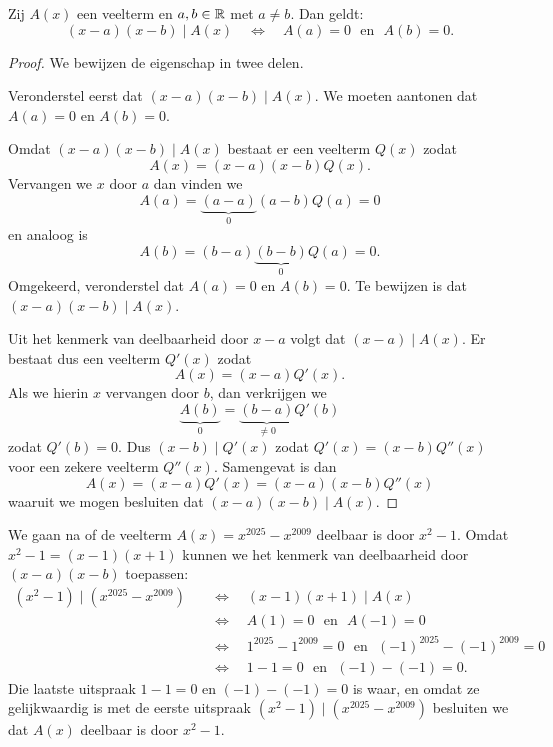 \documentclass{ximera}
\begin{document}
\begin{stelling} 
Zij $A(x)$ een veelterm en $a,b \in \mathbb{R}$ met $a \neq b$. Dan geldt:
\[
(x-a)(x-b) \mid A(x) \quad \Leftrightarrow \quad A(a) = 0 \,\, \text{ en } \,\, A(b) = 0.
\]
\end{stelling}
\begin{Uitbreiding}
\begin{proof}
We bewijzen de eigenschap in twee delen.

Veronderstel eerst dat $(x-a)(x-b) \mid A(x)$. We moeten aantonen dat $A(a) = 0$ en $A(b) = 0$.

Omdat $(x-a)(x-b) \mid A(x)$ bestaat er een veelterm $Q(x)$ zodat
\[
A(x) = (x-a)(x-b)Q(x).
\]
Vervangen we $x$ door $a$ dan vinden we 
\[
A(a) = \underbrace{(a-a)}_{0}(a-b)Q(a) = 0
\]
en analoog is
\[
A(b) = (b-a)\underbrace{(b-b)}_{0}Q(a) = 0.
\]
Omgekeerd, veronderstel dat $A(a) = 0$ en $A(b) = 0$. Te bewijzen is dat $(x-a)(x-b) \mid A(x)$.

Uit het kenmerk van deelbaarheid door $x-a$ volgt dat $(x-a) \mid A(x)$. Er bestaat dus een veelterm $Q'(x)$ zodat
\[
A(x) = (x-a)Q'(x).
\]
Als we hierin $x$ vervangen door $b$, dan verkrijgen we 
\[
\underbrace{A(b)}_{0} = \underbrace{(b - a)}_{\neq 0} Q'(b)
\]
zodat $Q'(b) = 0$. Dus $(x-b) \mid Q'(x)$ zodat $Q'(x) = (x-b)Q''(x)$ voor een zekere veelterm $Q''(x)$. Samengevat is dan
\[
A(x) = (x-a)Q'(x) = (x-a)(x-b)Q''(x)
\]
waaruit we mogen besluiten dat $(x-a)(x-b) \mid A(x)$.
\end{proof}
\end{Uitbreiding}

\begin{voorbeeld}
We gaan na of de veelterm $A(x) = x^{2025} - x^{2009}$ deelbaar is door $x^2 - 1$. Omdat $x^2-1 = (x-1)(x+1)$ kunnen we het kenmerk van deelbaarheid door $(x-a)(x-b)$ toepassen:
\begin{align*}
(x^2-1) \mid (x^{2025} - x^{2009}) \quad 
& \Leftrightarrow \quad (x-1)(x+1) \mid A(x) \\
& \Leftrightarrow \quad A(1) = 0 \,\, \text{ en } \,\, A(-1) = 0 \\
& \Leftrightarrow \quad 1^{2025} - 1^{2009} = 0 \,\, \text{ en } \,\, (-1)^{2025} - (-1)^{2009} = 0 \\
& \Leftrightarrow \quad 1 - 1 = 0 \,\, \text{ en } \,\, (-1) - (-1) = 0.
\end{align*}
Die laatste uitspraak $1 - 1 = 0$ en $(-1) - (-1) = 0$ is waar, en omdat ze gelijkwaardig is met de eerste uitspraak $(x^2-1) \mid (x^{2025} - x^{2009})$ besluiten we dat $A(x)$ deelbaar is door $x^2-1$. 
\end{voorbeeld}
\end{document}
